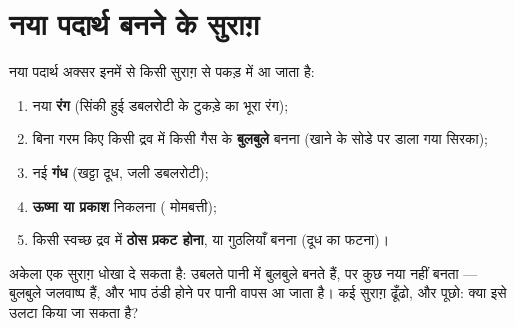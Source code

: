 \section{नया पदार्थ बनने के सुराग़}

\begin{method}[क्या यह रासायनिक परिवर्तन है? सुराग़ ढूँढो]\label{met:g5:irreversible-changes:clues}
नया पदार्थ अक्सर इनमें से किसी सुराग़ से पकड़ में आ जाता है:
\begin{enumerate}
  \item नया \textbf{रंग} (सिंकी हुई डबलरोटी के टुकड़े का भूरा रंग);
  \item बिना गरम किए किसी द्रव में किसी गैस के \textbf{बुलबुले}
        बनना (खाने के सोडे पर डाला गया सिरका);
  \item नई \textbf{गंध} (खट्टा दूध, जली डबलरोटी);
  \item \textbf{ऊष्मा या प्रकाश} निकलना ( मोमबत्ती);
  \item किसी स्वच्छ द्रव में \textbf{ठोस प्रकट होना}, या गुठलियाँ बनना
        (दूध का फटना)।
\end{enumerate}
अकेला एक सुराग़ धोखा दे सकता है: उबलते पानी में बुलबुले बनते हैं, पर कुछ
नया नहीं बनता --- बुलबुले जलवाष्प हैं, और भाप ठंडी होने पर पानी वापस आ
जाता है। कई सुराग़ ढूँढो, और पूछो: क्या इसे उलटा किया जा सकता है?
\end{method}

